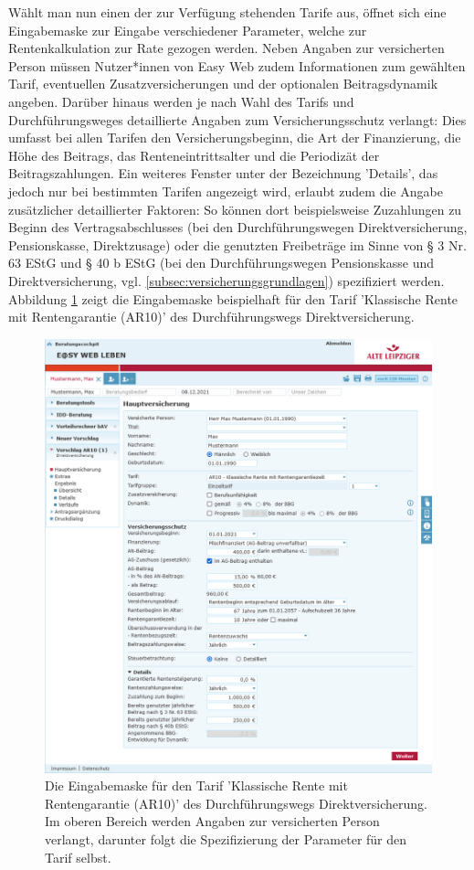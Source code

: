 Wählt man nun einen der zur Verfügung stehenden Tarife aus, öffnet sich eine Eingabemaske zur Eingabe verschiedener Parameter, welche zur Rentenkalkulation zur Rate gezogen werden. Neben Angaben zur versicherten Person müssen Nutzer*innen von Easy Web zudem Informationen zum gewählten Tarif, eventuellen Zusatzversicherungen und der optionalen Beitragsdynamik angeben. Darüber hinaus werden je nach Wahl des Tarifs und Durchführungsweges detaillierte Angaben zum Versicherungsschutz verlangt: Dies umfasst bei allen Tarifen den Versicherungsbeginn, die Art der Finanzierung, die Höhe des Beitrags, das Renteneintrittsalter und die Periodizät der Beitragszahlungen. Ein weiteres Fenster unter der Bezeichnung 'Details', das jedoch nur bei bestimmten Tarifen angezeigt wird, erlaubt zudem die Angabe zusätzlicher detaillierter Faktoren: So können dort beispielsweise Zuzahlungen zu Beginn des Vertragsabschlusses (bei den Durchführungswegen Direktversicherung, Pensionskasse, Direktzusage) oder die genutzten Freibeträge im Sinne von § 3 Nr. 63 EStG und § 40 b EStG (bei den Durchführungswegen Pensionskasse und Direktversicherung, vgl. \autoref{subsec:versicherungsgrundlagen}) spezifiziert werden. Abbildung \ref{fig:easyWebEingabe} zeigt die Eingabemaske beispielhaft für den Tarif 'Klassische Rente mit Rentengarantie (AR10)' des Durchführungswegs Direktversicherung.

\begin{figure}
\centering
\includegraphics[width=0.9\columnwidth]{images/Easy_Web_Eingabe.png}
\caption{Die Eingabemaske für den Tarif 'Klassische Rente mit Rentengarantie (AR10)' des Durchführungswegs Direktversicherung. Im oberen Bereich werden Angaben zur versicherten Person verlangt, darunter folgt die Spezifizierung der Parameter für den Tarif selbst.}
\label{fig:easyWebEingabe}
\end{figure}

